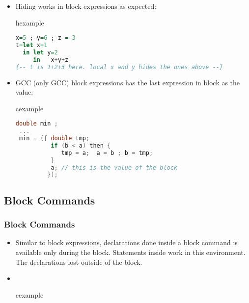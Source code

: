 \begin{frame}[fragile]
\begin{itemize}
 \item Hiding works in block expressions as expected:
\begin{beamercolorbox}{hexample}
\begin{lstlisting}[language={Haskell},escapechar=\#]
x=5 ; y=6 ; z = 3
t=let x=1 
  in let y=2 
     in   x+y+z
{-- t is 1+2+3 here. local x and y hides the ones above --}
\end{lstlisting}
\end{beamercolorbox}
 \item GCC (only GCC) block expressions has the last expression in block as the value:
\begin{beamercolorbox}{cexample}
\begin{lstlisting}[language=C,escapechar=\#]
 double min ;
 ...
 min = ({ double tmp;
          if (b < a) then {
             tmp = a;  a = b ; b = tmp;
          }
          a; // this is the value of the block
         });
\end{lstlisting}\end{beamercolorbox}
\end{itemize}
\end{frame}

\subsection{Block Commands}
\begin{frame}
\frametitle{Block Commands}
\begin{itemize}
 \item Similar to block expressions, declarations done inside a block command is available only
 during the block. Statements inside work in this environment. The declarations lost outside of
 the block. 
 \item \ \\
\begin{beamercolorbox}{cexample}
\codeblokcomC
\end{beamercolorbox}
\end{itemize}

\end{frame}

